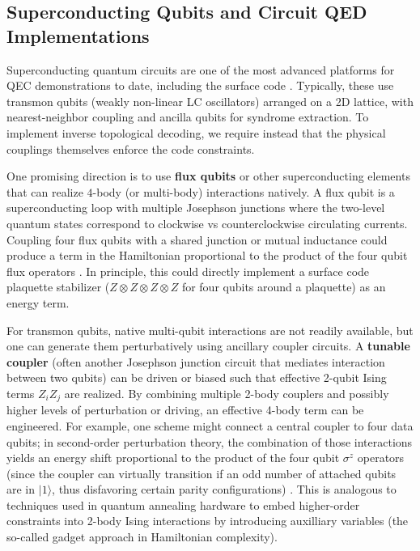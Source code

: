 \documentclass[11pt]{article}
\begin{document}
\subsection{Superconducting Qubits and Circuit QED Implementations}
Superconducting quantum circuits are one of the most advanced platforms for QEC demonstrations to date, including the surface code \cite{Acharya2023}. Typically, these use transmon qubits (weakly non-linear LC oscillators) arranged on a 2D lattice, with nearest-neighbor coupling and ancilla qubits for syndrome extraction. To implement inverse topological decoding, we require instead that the physical couplings themselves enforce the code constraints.

One promising direction is to use \textbf{flux qubits} or other superconducting elements that can realize $4$-body (or multi-body) interactions natively. A flux qubit is a superconducting loop with multiple Josephson junctions where the two-level quantum states correspond to clockwise vs counterclockwise circulating currents. Coupling four flux qubits with a shared junction or mutual inductance could produce a term in the Hamiltonian proportional to the product of the four qubit flux operators \cite{Gladchenko2009}. In principle, this could directly implement a surface code plaquette stabilizer ($Z\otimes Z\otimes Z \otimes Z$ for four qubits around a plaquette) as an energy term.

For transmon qubits, native multi-qubit interactions are not readily available, but one can generate them perturbatively using ancillary coupler circuits. A \textbf{tunable coupler} (often another Josephson junction circuit that mediates interaction between two qubits) can be driven or biased such that effective 2-qubit Ising terms $Z_i Z_j$ are realized. By combining multiple 2-body couplers and possibly higher levels of perturbation or driving, an effective 4-body term can be engineered. For example, one scheme might connect a central coupler to four data qubits; in second-order perturbation theory, the combination of those interactions yields an energy shift proportional to the product of the four qubit $\sigma^z$ operators (since the coupler can virtually transition if an odd number of attached qubits are in $|1\rangle$, thus disfavoring certain parity configurations) \cite{Xu2022Coupler}. This is analogous to techniques used in quantum annealing hardware to embed higher-order constraints into 2-body Ising interactions by introducing auxilliary variables (the so-called gadget approach in Hamiltonian complexity).
\end{document}
